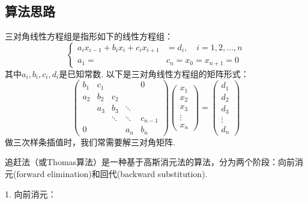 \documentclass[UTF8,ctexart,a4paper,11pt,openany]{article}
\theoremstyle{definition}
\begin{document}
    \subsection{算法思路}
    三对角线性方程组是指形如下的线性方程组：$$\left\{\begin{aligned} a_{i} x_{i-1}+b_{i} x_{i}+c_{i} x_{i+1} & =d_{i}, \quad i=1,2, \ldots, n \\ a_1=&c_n=x_{0}=x_{n+1}=0\end{aligned}\right.$$其中$a_i,b_i,c_i,d_i$是已知常数. 以下是三对角线性方程组的矩阵形式：$$\left(\begin{array}{ccccc}b_{1} & c_{1} & & & 0 \\ a_{2} & b_{2} & c_{2} & & \\ & a_{3} & b_{3} & \ddots & \\ & & \ddots & \ddots & c_{n-1} \\ 0 & & & a_{n} & b_{n}\end{array}\right)\left(\begin{array}{c}x_{1} \\ x_{2} \\ x_{3} \\ \vdots \\ x_{n}\end{array}\right)=\left(\begin{array}{c}d_{1} \\ d_{2} \\ d_{3} \\ \vdots \\ d_{n}\end{array}\right)$$做三次样条插值时，我们常需要解三对角矩阵.\par
    追赶法（或Thomas算法）是一种基于高斯消元法的算法，分为两个阶段：向前消元(forward elimination)和回代(backward substitution). \par
    1. 向前消元：\\
\end{document}
